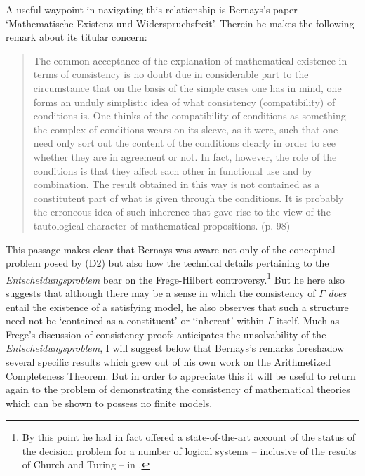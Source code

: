 \documentclass[11pt,fleqn,leqno]{article}
\begin{document}
A useful waypoint in navigating this relationship is Bernays's \citeyearpar{Bernays1950} paper `Mathematische Existenz und Widerspruchsfreit'.  Therein he makes the following remark about its titular concern:
\begin{quote}
{\footnotesize The common acceptance of the explanation of mathematical existence in terms of consistency is no doubt due in considerable part to the circumstance that on the basis of the simple cases one has in mind, one forms an unduly simplistic idea of what consistency (compatibility) of conditions is. One thinks of the compatibility of conditions as something the complex of conditions wears on its sleeve, as it were, such that one need only sort out the content of the conditions clearly in order to see whether they are in agreement or not. In fact, however, the role of the conditions is that they affect each other in functional use and by combination. The result obtained in this way is not contained as a constitutent part of what is given through the conditions. It is probably the erroneous idea of such inherence that gave rise to the view of the tautological character of mathematical propositions. \hfill (p. 98)}
\end{quote}
This passage makes clear that Bernays was aware not only of the conceptual problem posed by (D2) but also how the technical details pertaining to the \textsl{Entscheidungsproblem} bear on the Frege-Hilbert controversy.\footnote{By this point he had in fact offered a state-of-the-art account of the status of the decision problem for a number of logical systems -- inclusive of the results of Church and Turing -- in \citep[Sup. II]{Hilbert1939}.}  But he here also suggests that although there may be a sense in which the consistency of $\Gamma$ \textsl{does} entail the existence of a satisfying model, he also observes that such a structure need not be `contained as a constituent' or `inherent' within $\Gamma$ itself.  Much as Frege's discussion of consistency proofs anticipates the unsolvability of the \textsl{Entscheidungsproblem}, I will suggest below that Bernays's remarks foreshadow several specific results which grew out of his own work on the Arithmetized Completeness Theorem.  But in order to appreciate this it will be useful to return again to the problem of demonstrating the consistency of mathematical theories which can be shown to possess no finite models.    
\end{document}
